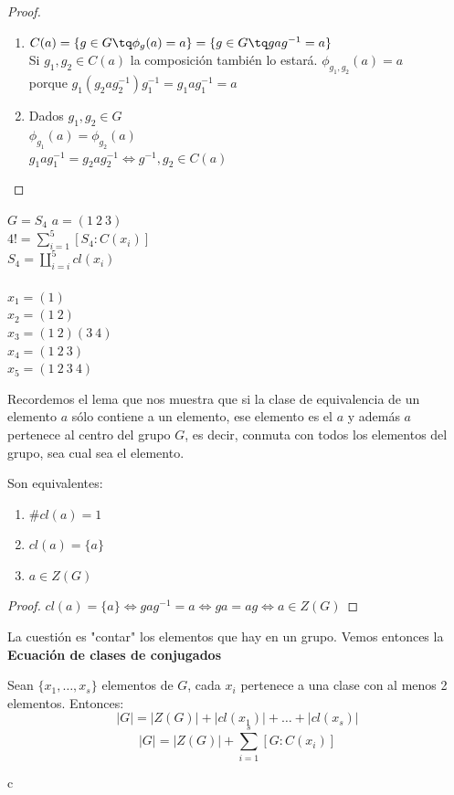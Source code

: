 \documentclass{apuntes}
\begin{document}
\begin{proof}
\begin{enumerate}
\item $C(a) = \{ g\in G \tq \phi _g(a) = a\} = \{ g\in G \tq gag^{-1} = a\}$\\
Si $g_1, g_2 \in C(a)$ la composición también lo estará. $\phi _{g_1, g_2}(a) = a$\\
porque $g_1(g_2ag_2^{-1})g_1^{-1} = g_1ag_1^{-1} = a$
\item Dados $g_1, g_2 \in G$\\
$\phi_{g_1} (a) = \phi_{g_2}(a)$\\
$g_1ag_1^{-1} = g_2ag_2^{-1} \iff g^{-1}, g_2 \in C(a)$\\
\end{enumerate}
\end{proof}

\begin{example}
$G= S_4$ $a = (1\ 2\ 3)$\\
$4! = \sum_{i=1}^{5}[S_4:C(x_i)]$\\
$S_4 = \coprod_{i=i}^{5} cl(x_i)$\\
\\
$x_1 = (1)$\\
$x_2 = (1\ 2)$\\
$x_3 = (1\ 2)(3\ 4)$\\
$x_4 = (1\ 2\ 3)$\\
$x_5 = (1\ 2\ 3\ 4)$
\end{example}

Recordemos el lema que nos muestra que si la clase de equivalencia de un elemento $a$ sólo contiene a un elemento, ese elemento es el $a$ y además $a$ pertenece al centro del grupo $G$, es decir, conmuta con todos los elementos del grupo, sea cual sea el elemento.

\begin{lemma}
Son equivalentes:
\begin{enumerate}
\item $\#cl(a) = 1$
\item $cl(a) = \{ a\}$
\item $a \in Z(G)$
\end{enumerate}
\end{lemma}

\begin{proof}
$cl(a) = \{ a \} \iff gag^{-1} = a \iff ga = ag \iff a \in Z(G)$
\end{proof}

La cuestión es "contar" los elementos que hay en un grupo. Vemos entonces la \textbf{Ecuación de clases de conjugados}
\begin{defn}
Sean $\{ x_1, \hdots, x_s \}$ elementos de $G$, cada $x_i$ pertenece a una clase con al menos 2 elementos. Entonces: \\
$$|G| = |Z(G)| + |cl(x_1)| + \hdots + |cl(x_s)|$$
$$|G| = |Z(G)| + \sum_{i=1}^{s}[G:C(x_i)]$$
\end{defn}c
\end{document}
